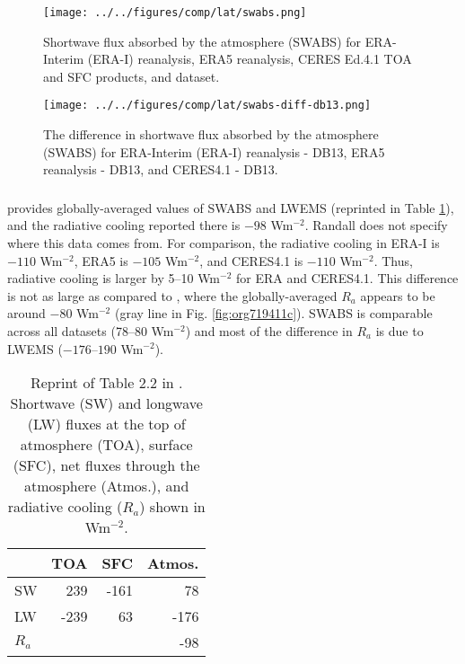\documentclass[11pt]{article}
\begin{document}
\begin{figure}[htbp]
\centering
\texttt{[image: ../../figures/comp/lat/swabs.png]}
\caption{\label{fig:org5cdef74}Shortwave flux absorbed by the atmosphere (SWABS) for ERA-Interim (ERA-I) reanalysis, ERA5 reanalysis, CERES Ed.4.1 TOA and SFC products, and \cite{donohoe_seasonal_2013} dataset.}
\end{figure}

\begin{figure}[htbp]
\centering
\texttt{[image: ../../figures/comp/lat/swabs-diff-db13.png]}
\caption{\label{fig:org864fef8}The difference in shortwave flux absorbed by the atmosphere (SWABS) for ERA-Interim (ERA-I) reanalysis - DB13, ERA5 reanalysis - DB13, and CERES4.1 - DB13.}
\end{figure}

\subsubsection{\cite{randall_atmosphere_2012}}
\label{sec:org1329435}
\cite{randall_atmosphere_2012} provides globally-averaged values of SWABS and LWEMS (reprinted in Table \ref{tab:org64baad4}), and the radiative cooling reported there is \(-98\) Wm\(^{-2}\). Randall does not specify where this data comes from. For comparison, the radiative cooling in ERA-I is \(-110\) Wm\(^{-2}\), ERA5 is \(-105\) Wm\(^{-2}\), and CERES4.1 is \(-110\) Wm\(^{-2}\). Thus, radiative cooling is larger by 5--10 Wm\(^{-2}\) for ERA and CERES4.1. This difference is not as large as compared to \cite{hartmann_global_2016}, where the globally-averaged \(R_a\) appears to be around \(-80\) Wm\(^{-2}\) (gray line in Fig. \ref{fig:org719411c}). SWABS is comparable across all datasets (78--80 Wm\(^{-2}\)) and most of the difference in \(R_a\) is due to LWEMS (\(-176\text{--}190\) Wm\(^{-2}\)).

\begin{table}[htbp]
\caption{\label{tab:org64baad4}Reprint of Table 2.2 in \cite{randall_atmosphere_2012}. Shortwave (SW) and longwave (LW) fluxes at the top of atmosphere (TOA), surface (SFC), net fluxes through the atmosphere (Atmos.), and radiative cooling (\(R_a\)) shown in Wm\(^{-2}\).}
\centering
\begin{tabular}{lrrr}
\hline
 & TOA & SFC & Atmos.\\
\hline
SW & 239 & -161 & 78\\
LW & -239 & 63 & -176\\
\hline
\(R_a\) &  &  & -98\\
\hline
\end{tabular}
\end{table}
\end{document}

